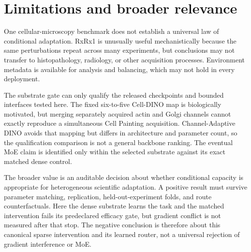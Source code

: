\section{Limitations and broader relevance}

One cellular-microscopy benchmark does not establish a universal law of conditional adaptation.
RxRx1 is unusually useful mechanistically because the same perturbations repeat across many
experiments, but conclusions may not transfer to histopathology, radiology, or other acquisition
processes. Environment metadata is available for analysis and balancing, which may not hold in
every deployment.

The substrate gate can only qualify the released checkpoints and bounded interfaces tested here.
The fixed six-to-five Cell-DINO map is biologically motivated, but merging separately acquired
actin and Golgi channels cannot exactly reproduce a simultaneous Cell Painting acquisition.
Channel-Adaptive DINO avoids that mapping but differs in architecture and parameter count, so the
qualification comparison is not a general backbone ranking. The eventual MoE claim is identified
only within the selected substrate against its exact matched dense control.

The broader value is an auditable decision about whether conditional capacity is appropriate for
heterogeneous scientific adaptation. A positive result must survive parameter matching,
replication, held-out-experiment folds, and route counterfactuals. Here the dense substrate learns
the task and the matched intervention fails its predeclared efficacy gate, but gradient conflict is
not measured after that stop. The negative conclusion is therefore about this canonical sparse
intervention and its learned router, not a universal rejection of gradient interference or MoE.
